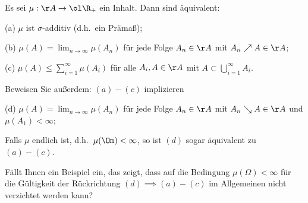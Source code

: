 \begin{prob}\label{ueb:Praemass}
Es sei $\mu:\AA\to\ol\R_+$ ein Inhalt. Dann sind \"aquivalent:

(a) $\mu$ ist $\sigma$-additiv (d.h.~ein Pr\"ama\ss);

(b) $\mu(A)=\lim_{n\to\infty}\mu(A_n)$ f\"ur jede Folge $A_n\in\AA$
mit $A_n\nearrow A\in\AA$;

(c) $\mu(A)\leq \sum_{i=1}^\infty\mu(A_i)$ f\"ur alle $A_i,A\in\AA$
mit $A\subset\bigcup_{i=1}^\infty A_i$.

Beweisen Sie außerdem: $(a) - (c)$ implizieren

(d) $\mu(A)=\lim_{n\to\infty}\mu(A_n)$ f\"ur jede Folge $A_n\in\AA$
mit $A_n\searrow A\in\AA$ und $\mu(A_1)<\infty$;

Falls $\mu$ endlich ist, d.h.~$\mu(\Om) < \infty$, so ist $(d)$ sogar \"aquivalent zu $(a) - (c)$.

F\"allt Ihnen ein Beispiel ein, das zeigt, dass auf die Bedingung $\mu(\Omega) < \infty$ für die G\"ultigkeit der R\"uckrichtung $(d) \implies (a) - (c)$ im Allgemeinen nicht verzichtet werden kann?
\end{prob}
